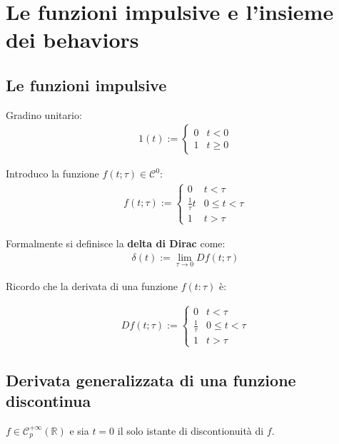\section{Le funzioni impulsive e l'insieme dei behaviors}

\subsection{Le funzioni impulsive}

Gradino unitario:
\begin{align}
	1(t) := \begin{cases}
		        0 & t < 0    \\
		        1 & t \geq 0
	        \end{cases}
\end{align}

Introduco la funzione $f(t;\tau) \in \mathcal{C}^0$:
\begin{align}
	f(t;\tau) := \begin{cases}
		             0               & t < \tau        \\
		             \frac{1}{\tau}t & 0 \leq t < \tau \\
		             1               & t > \tau
	             \end{cases}
\end{align}

Formalmente si definisce la \textbf{delta di Dirac} come:
\begin{align}
	\delta(t) := \lim_{\tau \to 0} Df(t;\tau)
\end{align}

Ricordo che la derivata di una funzione $f(t:\tau)$ è:

\begin{align}
	Df(t;\tau) := \begin{cases}
		              0              & t < \tau        \\
		              \frac{1}{\tau} & 0 \leq t < \tau \\
		              1              & t > \tau
	              \end{cases}
\end{align}


\subsection{Derivata generalizzata di una funzione discontinua}

$f \in \mathcal{C}^{+\infty}_p(\mathbb{R})$ e sia $t = 0$ il solo istante di discontionuità di $f$.

